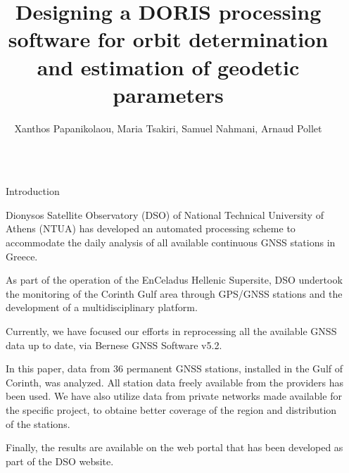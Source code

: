 \documentclass[final,a0,portrait]{beamer}
\title{Designing a DORIS processing software for orbit determination and estimation of geodetic parameters} %
\author{Xanthos Papanikolaou, Maria Tsakiri, Samuel Nahmani, Arnaud Pollet}%
\institute{Dionysos Satellite Observatory, School of Rural, Surveying \& Geoinformatics Engineering \\ \vspace{0.15em} \par{National Technical University of Athens}} %
\newlength{\sepwid}
\newlength{\onecolwid}
\begin{document}

\setlength{\belowcaptionskip}{2ex} %
\setlength\belowdisplayshortskip{2ex} %

\begin{frame}[t] %

\begin{columns}[t] %

\begin{column}{\sepwid}\end{column} %

\begin{column}{\onecolwid} %


\begin{block}{Introduction}
{\small
Dionysos Satellite Observatory (DSO) of National Technical University of Athens (NTUA)
has developed an automated processing scheme to accommodate the daily analysis of all available continuous GNSS stations in Greece.

As part of the operation of the EnCeladus Hellenic Supersite, DSO undertook the monitoring of the Corinth Gulf area through GPS/GNSS stations and the development of a multidisciplinary platform.

Currently, we have focused our efforts in reprocessing all the available GNSS data up to date, via Bernese GNSS Software v5.2\cite{bernese}.

In this paper, data from 36 permanent GNSS stations, installed in the Gulf of Corinth, was analyzed. All station data freely available from the providers has been used. We have also utilize data from private networks made available for the specific project, to obtaine better coverage of the region and distribution of the stations. 

Finally, the results are available on the web portal that has been developed as part of the DSO website. 

}
\end{block}
\end{column}
\end{columns}
\end{frame}
\end{document}
